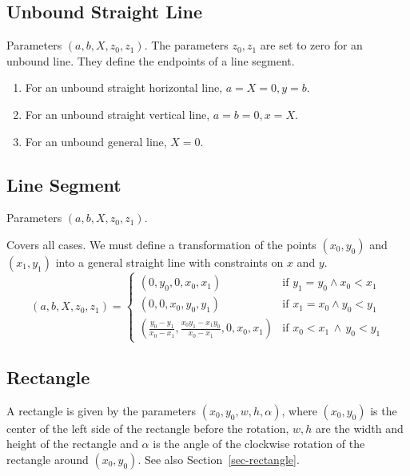 \documentclass[11pt]{article}
\begin{document}
\subsection{Unbound Straight Line}


Parameters $(a, b, X, z_0, z_1)$.
The parameters $z_0, z_1$ are set to zero for an unbound line. They define
the endpoints of a line segment.

\begin{enumerate}
    \item For an unbound straight horizontal line, $a=X=0, y=b$.
    \item For an unbound straight vertical line, $a=b=0, x=X$.
    \item For an unbound general line, $X=0$.
\end{enumerate}

\subsection{Line Segment}
\label{sec-representation-line-segment}

Parameters $(a, b, X, z_0, z_1)$.

Covers all cases. We must define a transformation of the points $(x_0, y_0)$
and $(x_1, y_1)$  into a general straight line with constraints on $x$ and $y$.
\begin{equation}
    (a, b, X, z_0, z_1) =
    \begin{cases}
        (0, y_0, 0, x_0, x_1)  &
        \text{if $y_1 = y_0\land x_0 < x_1$}\\
        (0, 0, x_0, y_0, y_1) &
        \text{if $x_1 = x_0\land  y_0 < y_1 $}\\
        \left(\frac{y_0 - y_1}{x_0-x_1},
            \frac{x_0 y_1 - x_1 y_0}{x_0 - x_1}, 0, x_0, x_1\right) &
            \text{if $x_0< x_1\,\land\,y_0< y_1$}
    \end{cases}
\end{equation}

\subsection{Rectangle}

A rectangle is given by the parameters $(x_0, y_0, w, h, \alpha)$, where $(x_0,
y_0)$ is the center of the left side of the rectangle before the rotation, $w,
h$ are the width and height of the rectangle and $\alpha$ is the angle of the
clockwise rotation of the rectangle around $(x_0, y_0)$. See also
Section~\ref{sec-rectangle}.
\end{document}
